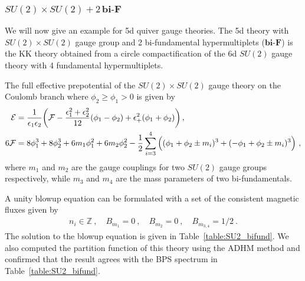 \subsubsection{\texorpdfstring{$SU(2)\times SU(2)+2\,\mathbf{bi\text{-}F}$}{SU(2)*SU(2) + 2bifund}}

We will now give an example for 5d quiver gauge theories. The 5d theory with $SU(2)\times SU(2)$ gauge group and 2 bi-fundamental hypermultiplets ($\mathbf{bi\text{-}F}$) is the KK theory obtained from a circle compactification of the 6d $SU(2)$ gauge theory with 4 fundamental hypermultiplets.

The full effective prepotential of the $ SU(2) \times SU(2) $ gauge theory on the Coulomb branch where $\phi_2\ge\phi_1>0$ is given by
\begin{align}
\mathcal{E}
&= \frac{1}{\epsilon_1 \epsilon_2} \qty(\mathcal{F} - \frac{\epsilon_1^2 + \epsilon_2^2}{12} \qty(\phi_1 - \phi_2) + \epsilon_+^2 (\phi_1 + \phi_2) ) \,,  \\
6\mathcal{F}
&= 8\phi_1^3 + 8\phi_2^3 + 6m_1 \phi_1^2 + 6m_2 \phi_2^2 - \frac{1}{2}\sum_{i=3}^4\Big((\phi_1 + \phi_2 \pm m_i)^3 + (-\phi_1 + \phi_2 \pm m_i)^3 \Big) \ , \nonumber
\end{align}
where $ m_1 $ and $ m_2 $ are the gauge couplings for two $ SU(2) $ gauge groups respectively, while $ m_3$ and $m_4 $ are the mass parameters of two bi-fundamentals. 

A unity blowup equation can be formulated with a set of the consistent magnetic fluxes given by
\begin{align}
n_i \in \mathbb{Z} \ , \quad
B_{m_1} = 0 \ , \quad
B_{m_2} = 0 \ , \quad
B_{m_{3,4}} = 1/2 \ .
\end{align}
The solution to the blowup equation is given in Table~\ref{table:SU2_bifund}. We also computed the partition function of this theory using the ADHM method and confirmed that the result agrees with the BPS spectrum in Table~\ref{table:SU2_bifund}. 

